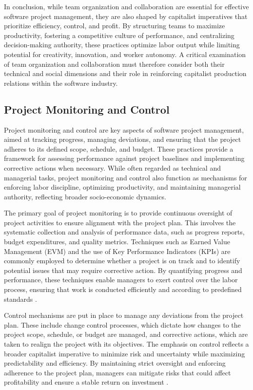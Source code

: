 \begin{refsection}
In conclusion, while team organization and collaboration are essential for effective software project management, they are also shaped by capitalist imperatives that prioritize efficiency, control, and profit. By structuring teams to maximize productivity, fostering a competitive culture of performance, and centralizing decision-making authority, these practices optimize labor output while limiting potential for creativity, innovation, and worker autonomy. A critical examination of team organization and collaboration must therefore consider both their technical and social dimensions and their role in reinforcing capitalist production relations within the software industry.

\subsection{Project Monitoring and Control}

Project monitoring and control are key aspects of software project management, aimed at tracking progress, managing deviations, and ensuring that the project adheres to its defined scope, schedule, and budget. These practices provide a framework for assessing performance against project baselines and implementing corrective actions when necessary. While often regarded as technical and managerial tasks, project monitoring and control also function as mechanisms for enforcing labor discipline, optimizing productivity, and maintaining managerial authority, reflecting broader socio-economic dynamics.

The primary goal of project monitoring is to provide continuous oversight of project activities to ensure alignment with the project plan. This involves the systematic collection and analysis of performance data, such as progress reports, budget expenditures, and quality metrics. Techniques such as Earned Value Management (EVM) and the use of Key Performance Indicators (KPIs) are commonly employed to determine whether a project is on track and to identify potential issues that may require corrective action. By quantifying progress and performance, these techniques enable managers to exert control over the labor process, ensuring that work is conducted efficiently and according to predefined standards \cite[pp.~721-724]{Kerzner2009ProjectManagement}.

Control mechanisms are put in place to manage any deviations from the project plan. These include change control processes, which dictate how changes to the project scope, schedule, or budget are managed, and corrective actions, which are taken to realign the project with its objectives. The emphasis on control reflects a broader capitalist imperative to minimize risk and uncertainty while maximizing predictability and efficiency. By maintaining strict oversight and enforcing adherence to the project plan, managers can mitigate risks that could affect profitability and ensure a stable return on investment \cite[pp.~37-39]{Fleming2010EarnedValue}.


\end{refsection}

